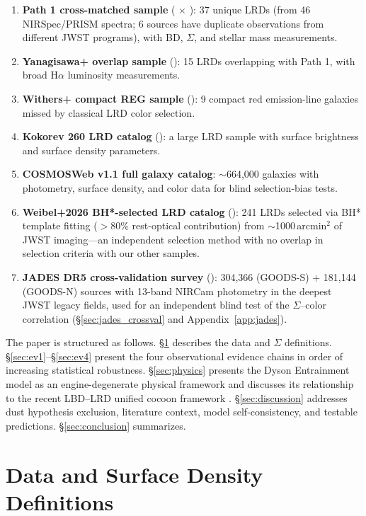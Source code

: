 \documentclass[twocolumn,linenumbers]{aastex631}
\begin{document}
\begin{enumerate}
\item \textbf{Path 1 cross-matched sample} (\citealt{deGraaff2025} $\times$ \citealt{Kokorev2024}): 37 unique LRDs (from 46 NIRSpec/PRISM spectra; 6 sources have duplicate observations from different JWST programs), with BD, $\Sigma$, and stellar mass measurements.
\item \textbf{Yanagisawa+ overlap sample} (\citealt{Yanagisawa2026}): 15 LRDs overlapping with Path 1, with broad H$\alpha$ luminosity measurements.
\item \textbf{Withers+ compact REG sample} (\citealt{Withers2026}): 9 compact red emission-line galaxies missed by classical LRD color selection.
\item \textbf{Kokorev 260 LRD catalog} (\citealt{Kokorev2024}): a large LRD sample with surface brightness and surface density parameters.
\item \textbf{COSMOSWeb v1.1 full galaxy catalog}: $\sim$664,000 galaxies with photometry, surface density, and color data for blind selection-bias tests.
\item \textbf{Weibel+2026 BH*-selected LRD catalog} (\citealt{Weibel2026}): 241 LRDs selected via BH* template fitting ($>80\%$ rest-optical contribution) from $\sim$1000\,arcmin$^2$ of JWST imaging---an independent selection method with no overlap in selection criteria with our other samples.
\item \textbf{JADES DR5 cross-validation survey} (\citealt{JADESDR5}): 304,366 (GOODS-S) $+$ 181,144 (GOODS-N) sources with 13-band NIRCam photometry in the deepest JWST legacy fields, used for an independent blind test of the $\Sigma$--color correlation (\S\ref{sec:jades_crossval} and Appendix~\ref{app:jades}).
\end{enumerate}

The paper is structured as follows. \S\ref{sec:data} describes the data and $\Sigma$ definitions. \S\ref{sec:ev1}--\S\ref{sec:ev4} present the four observational evidence chains in order of increasing statistical robustness. \S\ref{sec:physics} presents the Dyson Entrainment model as an engine-degenerate physical framework and discusses its relationship to the recent LBD--LRD unified cocoon framework \citep{Sneppen2026a}. \S\ref{sec:discussion} addresses dust hypothesis exclusion, literature context, model self-consistency, and testable predictions. \S\ref{sec:conclusion} summarizes.

\section{Data and Surface Density Definitions} \label{sec:data}
\end{document}
